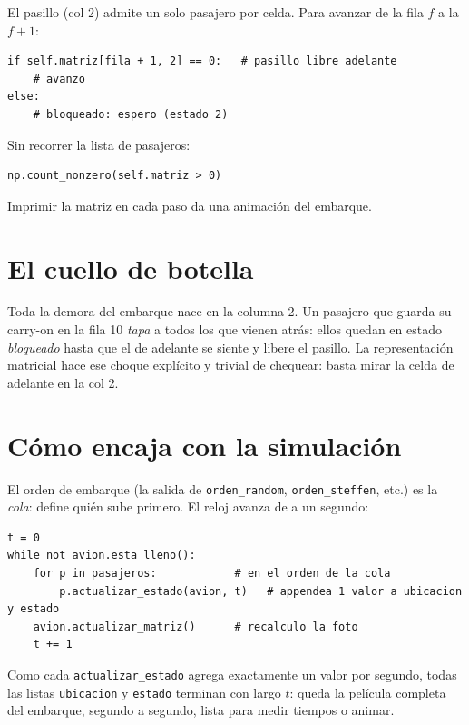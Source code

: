 \documentclass[11pt,a4paper]{article}
\begin{document}
\begin{description}[leftmargin=1.4em, style=nextline]
  \item[Detectar bloqueos] El pasillo (col 2) admite un solo pasajero por celda.
        Para avanzar de la fila $f$ a la $f{+}1$:
        \begin{lstlisting}
if self.matriz[fila + 1, 2] == 0:   # pasillo libre adelante
    # avanzo
else:
    # bloqueado: espero (estado 2)
        \end{lstlisting}
  \item[Contar a bordo] Sin recorrer la lista de pasajeros:
        \begin{lstlisting}
np.count_nonzero(self.matriz > 0)
        \end{lstlisting}
  \item[Visualizar] Imprimir la matriz en cada paso da una animación del embarque.
\end{description}

\section{El cuello de botella}

Toda la demora del embarque nace en la columna 2. Un pasajero que guarda su carry-on en
la fila 10 \emph{tapa} a todos los que vienen atrás: ellos quedan en estado
\emph{bloqueado} hasta que el de adelante se siente y libere el pasillo. La representación
matricial hace ese choque explícito y trivial de chequear: basta mirar la celda de
adelante en la col 2.

\section{Cómo encaja con la simulación}

El orden de embarque (la salida de \texttt{orden\_random}, \texttt{orden\_steffen}, etc.)
es la \emph{cola}: define quién sube primero. El reloj avanza de a un segundo:

\begin{lstlisting}
t = 0
while not avion.esta_lleno():
    for p in pasajeros:            # en el orden de la cola
        p.actualizar_estado(avion, t)   # appendea 1 valor a ubicacion y estado
    avion.actualizar_matriz()      # recalculo la foto
    t += 1
\end{lstlisting}

Como cada \texttt{actualizar\_estado} agrega exactamente un valor por segundo, todas las
listas \texttt{ubicacion} y \texttt{estado} terminan con largo $t$: queda la película
completa del embarque, segundo a segundo, lista para medir tiempos o animar.
\end{document}
